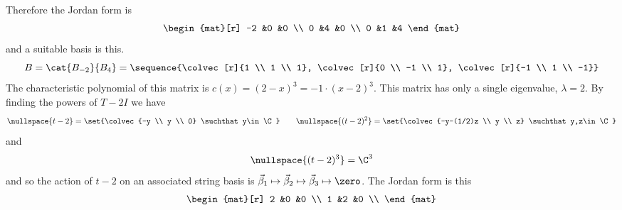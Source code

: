 \begin{exercises}
\begin{answer}
\begin{exparts}
            Therefore the Jordan form is  
            \begin{equation*}
              \begin{mat}[r]
                -2  &0  &0  \\
                 0  &4  &0  \\
                 0  &1  &4
              \end{mat}
            \end{equation*}
            and a suitable basis is this.
            \begin{equation*}
              B=\cat{B_{-2}}{B_4}=
                \sequence{\colvec[r]{1 \\ 1 \\ 1},
                          \colvec[r]{0 \\ -1 \\ 1},
                          \colvec[r]{-1 \\ 1 \\ -1}}
            \end{equation*}
        \partsitem The characteristic polynomial of this
            matrix is \( c(x)=(2-x)^3=-1\cdot (x-2)^3 \).
            This matrix has only a single eigenvalue, $\lambda=2$.
            By finding the powers of $T-2I$ we have  
            \begin{equation*}
              \nullspace{t-2}=\set{\colvec{-y \\ y \\ 0}
                                      \suchthat y\in\C} 
              \qquad
              \nullspace{(t-2)^2}=\set{\colvec{-y-(1/2)z \\ y \\ z}
                                          \suchthat y,z\in\C}
            \end{equation*}
            and
            \begin{equation*} 
              \nullspace{(t-2)^3}=\C^3
            \end{equation*}
            and so 
            the action of $t-2$ on an
            associated string basis is
            $\vec{\beta}_1\mapsto\vec{\beta}_2\mapsto
                   \vec{\beta}_3\mapsto\zero$.
            The Jordan form is this
            \begin{equation*}
                  \begin{mat}[r]
                    2  &0  &0  \\
                    1  &2  &0  \\

\end{mat}
\end{equation*}
\end{exparts}
\end{answer}
\end{exercises}

